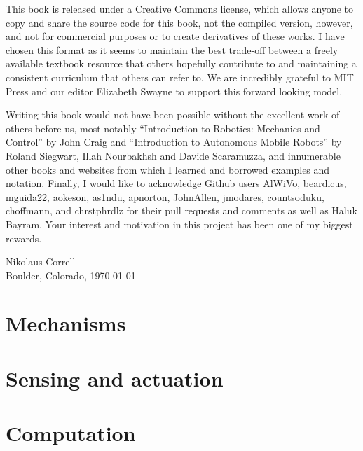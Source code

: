 \documentclass[paper=6.14in:9.21in,pagesize=pdftex,11pt,twoside,openright]{scrbook}
\begin{document}
This book is released under a Creative Commons license, which allows anyone to copy and share the source code for this book, not the compiled version, however, and not for commercial purposes or to create derivatives of these works. I have chosen this format as it seems to maintain the best trade-off between a freely available textbook resource that others hopefully contribute to and maintaining a consistent curriculum that others can refer to. We are incredibly grateful to MIT Press and our editor Elizabeth Swayne to support this forward looking model.

Writing this book would not have been possible without the excellent work of others before us, most notably ``Introduction to Robotics: Mechanics and Control'' by John Craig and ``Introduction to Autonomous Mobile Robots'' by Roland Siegwart, Illah Nourbakhsh and Davide Scaramuzza, and innumerable other books and websites from which I learned and borrowed examples and notation. Finally, I would like to acknowledge Github users AlWiVo, beardicus, mguida22, aokeson, as1ndu, apnorton, JohnAllen, jmodares, countsoduku, choffmann, and chrstphrdlz for their pull requests and comments as well as Haluk Bayram. Your interest and motivation in this project has been one of my biggest rewards.

\begin{flushright}
Nikolaus Correll\\
Boulder, Colorado, \today
\end{flushright}



\part{Mechanisms}





\part{Sensing and actuation}




\part{Computation}











\appendix













\printindex
\end{document}
